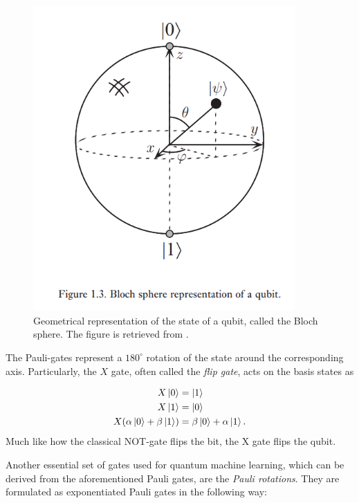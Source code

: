 \begin{figure}[htp]
    \centering
    \includegraphics[width=10cm]{latex/figures/Blochsphere.PNG}
    \caption{Geometrical representation of the state of a qubit, called the Bloch sphere. The figure is retrieved from \citet{NielsenQuantum}.}
    \label{fig:blochsphere}
\end{figure}

The Pauli-gates represent a $180^{\circ}$ rotation of the state around the corresponding axis. Particularly, the $X$ gate, often called the \emph{flip gate}, acts on the basis states as

\begin{equation}
\begin{aligned}
    X\ket{0} &= \ket{1} \\
    X\ket{1} &= \ket{0} \\
    X(\alpha \ket{0} + \beta\ket{1}) &= \beta \ket{0} + \alpha\ket{1}.
\end{aligned}    
\end{equation}
Much like how the classical NOT-gate flips the bit, the X gate flips the qubit.

Another essential set of gates used for quantum machine learning, which can be derived from the aforementioned Pauli gates, are the \emph{Pauli rotations}. They are formulated as exponentiated Pauli gates in the following way:

